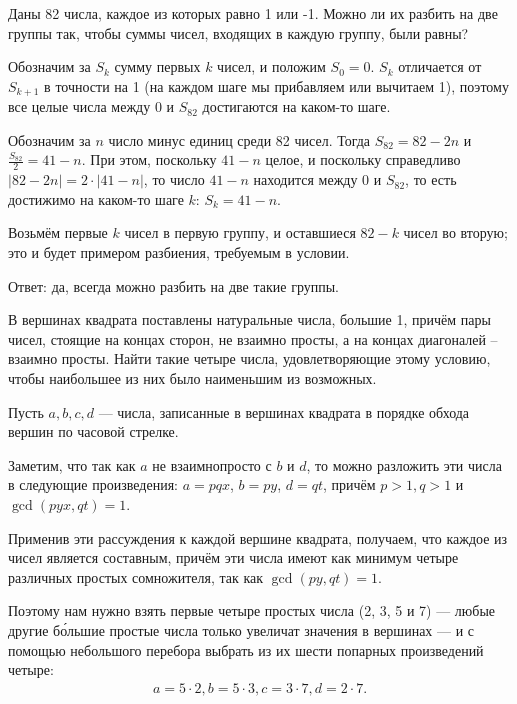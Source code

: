 

\begin{itemize}
\itA Даны 82 числа, каждое из которых равно 1 или -1. Можно ли их разбить на две группы так, 
чтобы суммы чисел, входящих в каждую группу, были равны?

\itr Обозначим за $S_k$ сумму первых $k$ чисел, и положим $S_0 = 0$. 
$S_k$ отличается от $S_{k+1}$ в точности на 1 (на каждом шаге мы прибавляем или 
вычитаем 1), поэтому все целые числа между $0$ и $S_{82}$ достигаются на каком-то шаге.

Обозначим за $n$ число минус единиц среди 82 чисел. Тогда $S_{82} = 82-2n$
и $\frac{S_{82}}{2} = 41-n$. При этом, поскольку $41-n$ целое, и поскольку справедливо 
$|82-2n|=2\cdot|41-n|$, то число $41-n$ находится между 0 и $S_{82}$, то есть 
достижимо на каком-то шаге $k$: $S_k = 41-n$.

Возьмём первые $k$ чисел в первую группу, и оставшиеся $82-k$ чисел во вторую; это и будет
примером разбиения, требуемым в условии. 

Ответ: да, всегда можно разбить на две такие группы.
\end{itemize}


\begin{itemize}
\itC В вершинах квадрата поставлены натуральные числа, большие 1, причём пары чисел, стоящие на концах сторон, не взаимно просты, а на концах диагоналей – взаимно просты. Найти такие четыре числа, удовлетворяющие этому условию,
чтобы наибольшее из них было наименьшим из возможных.

\itr 
Пусть $a,b,c,d$ --- числа, записанные в вершинах квадрата в порядке обхода вершин по часовой стрелке. 

Заметим, что так как $a$ не взаимнопросто с $b$ и $d$, то можно разложить эти числа в следующие произведения:
$a = pqx$, $b = py$, $d = qt$, причём $p>1, q>1$ и $\gcd(pyx,qt)=1$. 

Применив эти рассуждения к каждой вершине квадрата, получаем, что каждое из чисел является
составным, причём эти числа имеют как минимум четыре различных простых сомножителя, 
так как $\gcd(py,qt)=1$. 

Поэтому нам нужно взять первые четыре простых числа (2, 3, 5 и 7) --- любые другие б\'ольшие простые числа
только увеличат значения в вершинах --- и с помощью небольшого перебора
выбрать из их шести попарных произведений четыре:
$$
\begin{array}{l}
a=5 \cdot 2,
b=5 \cdot 3,
c=3 \cdot 7,
d=2 \cdot 7.
\end{array}
$$
\end{itemize}

